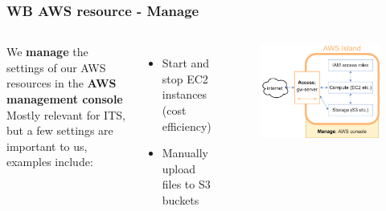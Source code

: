 \documentclass[aspectratio=169]{beamer} %
\begin{document}
\begin{frame}
	\frametitle{WB AWS resource - Manage}
	\begin{columns}[c]
		We \textbf{manage} the settings of our AWS resources in the \textbf{AWS management console}
		\vspace{1cm}\newline
		Mostly relevant for ITS, but a few settings are important to us, examples include:
		\begin{itemize}
			\item Start and stop EC2 instances (cost efficiency)
			\item Manually upload files to S3 buckets
		\end{itemize}

		\begin{figure}
			\centering
			\includegraphics[width=\textwidth]{./img/wb-aws.png}
		\end{figure}

	\end{columns}
\end{frame}
\end{document}
